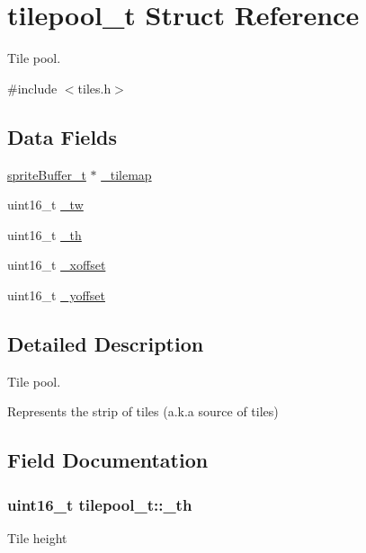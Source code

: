 \hypertarget{structtilepool__t}{}\section{tilepool\+\_\+t Struct Reference}
\label{structtilepool__t}


Tile pool.  




{\ttfamily \#include $<$tiles.\+h$>$}

\subsection*{Data Fields}
\begin{DoxyCompactItemize}
\item 
\hyperlink{structsprite_buffer__t}{sprite\+Buffer\+\_\+t} $\ast$ \hyperlink{structtilepool__t_a2bb67a7343217713e040b5b226b7dd32}{\+\_\+tilemap}
\item 
uint16\+\_\+t \hyperlink{structtilepool__t_af3e69db6b6fc3ea8a1cfbe57a7f03331}{\+\_\+tw}
\item 
uint16\+\_\+t \hyperlink{structtilepool__t_a93705a60174f75c507a2168ddae2f45e}{\+\_\+th}
\item 
uint16\+\_\+t \hyperlink{structtilepool__t_aa13b342aa0f301e0d9b160e17a1e23d8}{\+\_\+xoffset}
\item 
uint16\+\_\+t \hyperlink{structtilepool__t_a3d49b78c34fd815960055061dc4e3086}{\+\_\+yoffset}
\end{DoxyCompactItemize}


\subsection{Detailed Description}
Tile pool. 

Represents the strip of tiles (a.\+k.\+a source of tiles) 

\subsection{Field Documentation}
\subsubsection[{\texorpdfstring{\+\_\+th}{\_th}}]{\setlength{\rightskip}{0pt plus 5cm}uint16\+\_\+t tilepool\+\_\+t\+::\+\_\+th}\hypertarget{structtilepool__t_a93705a60174f75c507a2168ddae2f45e}{}\label{structtilepool__t_a93705a60174f75c507a2168ddae2f45e}
Tile height 
